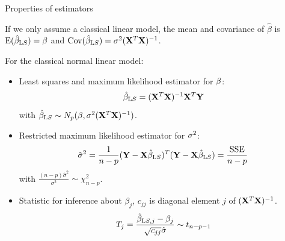 \documentclass[
  ignorenonframetext,
]{beamer}
\begin{document}
\begin{frame}

\begin{block}{Properties of estimators}

If we only assume a classical linear model, the mean and covariance of
\(\hat{\beta}\) is \(\text{E}(\hat{\beta}_{\text LS})=\beta\) and
\(\text{Cov}(\hat{\beta}_{\text LS})=\sigma^2({\bf X}^T{\bf X})^{-1}\).

For the classical normal linear model:

\begin{itemize}
\item
  Least squares and maximum likelihood estimator for \({\bf \beta}\):
  \[ \hat{\beta}_{\text LS}=({\bf X}^T{\bf X})^{-1} {\bf X}^T {\bf Y}\]
  with
  \(\hat{\beta}_{\text LS}\sim N_{p}(\beta,\sigma^2({\bf X}^T{\bf X})^{-1})\).
\item
  Restricted maximum likelihood estimator for \({\bf \sigma}^2\):
  \[ \hat{\sigma}^2=\frac{1}{n-p}({\bf Y}-{\bf X}\hat{\beta}_{\text LS})^T({\bf Y}-{\bf X}\hat{\beta}_{\text LS})=\frac{\text{SSE}}{n-p}\]
  with \(\frac{(n-p)\hat{\sigma}^2}{\sigma^2} \sim \chi^2_{n-p}\).
\item
  Statistic for inference about \(\beta_j\), \(c_{jj}\) is diagonal
  element \(j\) of \(({\bf X}^T{\bf X})^{-1}\).
  \[ T_j=\frac{\hat{\beta}_{\text LS,j}-\beta_j}{\sqrt{c_{jj}}\hat{\sigma}}\sim t_{n-p-1}\]
\end{itemize}

\end{block}

\end{frame}
\end{document}
